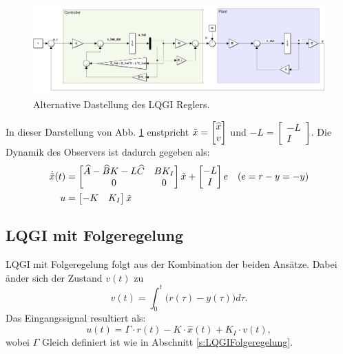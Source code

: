     \begin{figure}[H]
        \centering
        \includegraphics[width = \linewidth]{images/10/LQGI_alt.png}
        \caption{Alternative Dastellung des LQGI Reglers.}
        \label{fig:lqgialt}
    \end{figure}
    In dieser Darstellung von Abb. \ref{fig:lqgialt} enstpricht $\Tilde{x} = \begin{bmatrix}\widehat{x} \\ v\end{bmatrix}$ und $-L = \begin{bmatrix}-L\\ I \end{bmatrix}$. Die Dynamik des Observers ist dadurch gegeben als:
    \begin{align*}
        \Dot{\Tilde{x}}(t) &= \begin{bmatrix} \widehat{A}-\widehat{B}K - L\widehat{C} & BK_I\\
        0 & 0
        \end{bmatrix}\Tilde{x} + \begin{bmatrix} -L \\ I \end{bmatrix} e \quad (e = r-y = -y)\\
        u &= \begin{bmatrix} -K & K_I \end{bmatrix}\Tilde{x}
    \end{align*}
        
\subsection{LQGI mit Folgeregelung}
    LQGI mit Folgeregelung folgt aus der Kombination der beiden Ansätze. Dabei änder sich der Zustand $v(t)$ zu
    \begin{equation*}
        v(t) = \int_0^t \big(r(\tau)-y(\tau)\big)d\tau.
    \end{equation*}
    Das Eingangssignal resultiert als:
    \begin{equation*}
        u(t) = \mathit{\Gamma}\cdot r(t) - K \cdot\widehat{x}(t)+K_I\cdot v(t),
    \end{equation*}
    wobei $ \mathit{\Gamma}$ Gleich definiert ist wie in Abschnitt \ref{s:LQGIFolgeregelung}.
    
